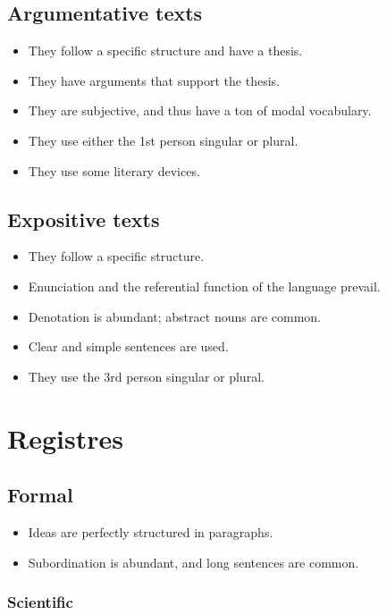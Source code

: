 \documentclass{article}
\begin{document}
\subsection*{Argumentative texts}

\begin{itemize}
    \item They follow a specific structure and have a thesis.
    \item They have arguments that support the thesis.
    \item They are subjective, and thus have a ton of modal vocabulary.
    \item They use either the 1st person singular or plural.
    \item They use some literary devices.
\end{itemize}

\subsection*{Expositive texts}

\begin{itemize}
    \item They follow a specific structure.
    \item Enunciation and the referential function of the language prevail.
    \item Denotation is abundant; abstract nouns are common.
    \item Clear and simple sentences are used.
    \item They use the 3rd person singular or plural.
\end{itemize}

\section*{Registres}

\subsection*{Formal}

\begin{itemize}
    \item Ideas are perfectly structured in paragraphs.
    \item Subordination is abundant, and long sentences are common.
\end{itemize}

\subsubsection*{Scientific}
\end{document}
